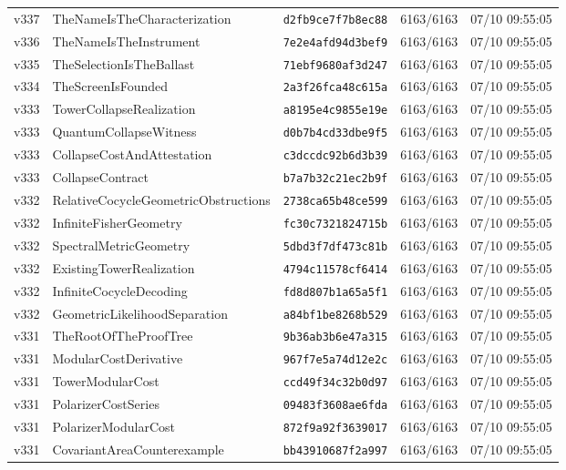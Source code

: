 \documentclass[11pt]{article}
\theoremstyle{definition}\newtheorem{deriv}{Derivação}
\begin{document}
{\begin{longtable}{@{}lllll@{}}
v337 & TheNameIsTheCharacterization & \texttt{d2fb9ce7f7b8ec88} & 6163/6163 & 07/10 09:55:05 \\
v336 & TheNameIsTheInstrument & \texttt{7e2e4afd94d3bef9} & 6163/6163 & 07/10 09:55:05 \\
v335 & TheSelectionIsTheBallast & \texttt{71ebf9680af3d247} & 6163/6163 & 07/10 09:55:05 \\
v334 & TheScreenIsFounded & \texttt{2a3f26fca48c615a} & 6163/6163 & 07/10 09:55:05 \\
v333 & TowerCollapseRealization & \texttt{a8195e4c9855e19e} & 6163/6163 & 07/10 09:55:05 \\
v333 & QuantumCollapseWitness & \texttt{d0b7b4cd33dbe9f5} & 6163/6163 & 07/10 09:55:05 \\
v333 & CollapseCostAndAttestation & \texttt{c3dccdc92b6d3b39} & 6163/6163 & 07/10 09:55:05 \\
v333 & CollapseContract & \texttt{b7a7b32c21ec2b9f} & 6163/6163 & 07/10 09:55:05 \\
v332 & RelativeCocycleGeometricObstructions & \texttt{2738ca65b48ce599} & 6163/6163 & 07/10 09:55:05 \\
v332 & InfiniteFisherGeometry & \texttt{fc30c7321824715b} & 6163/6163 & 07/10 09:55:05 \\
v332 & SpectralMetricGeometry & \texttt{5dbd3f7df473c81b} & 6163/6163 & 07/10 09:55:05 \\
v332 & ExistingTowerRealization & \texttt{4794c11578cf6414} & 6163/6163 & 07/10 09:55:05 \\
v332 & InfiniteCocycleDecoding & \texttt{fd8d807b1a65a5f1} & 6163/6163 & 07/10 09:55:05 \\
v332 & GeometricLikelihoodSeparation & \texttt{a84bf1be8268b529} & 6163/6163 & 07/10 09:55:05 \\
v331 & TheRootOfTheProofTree & \texttt{9b36ab3b6e47a315} & 6163/6163 & 07/10 09:55:05 \\
v331 & ModularCostDerivative & \texttt{967f7e5a74d12e2c} & 6163/6163 & 07/10 09:55:05 \\
v331 & TowerModularCost & \texttt{ccd49f34c32b0d97} & 6163/6163 & 07/10 09:55:05 \\
v331 & PolarizerCostSeries & \texttt{09483f3608ae6fda} & 6163/6163 & 07/10 09:55:05 \\
v331 & PolarizerModularCost & \texttt{872f9a92f3639017} & 6163/6163 & 07/10 09:55:05 \\
v331 & CovariantAreaCounterexample & \texttt{bb43910687f2a997} & 6163/6163 & 07/10 09:55:05 \\

\end{longtable}}
\end{document}
